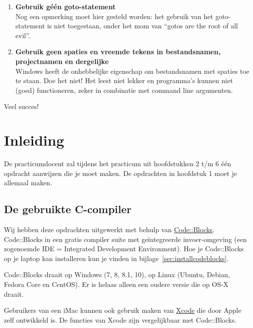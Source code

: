 \documentclass[a4paper,10pt,fleqn,twoside]{article}
\begin{document}
\begin{enumerate}[label=\textbf{\arabic*.}]
Als je niet begrijpt waar het programma fout gaat, steek dan niet direct je hand omhoog. Zet in je code op de plek waar het programma vermoedelijk nog correct werkt een \textsl{breakpoint}\footnote{In de les wordt uitgelegd hoe je dit moet doen.}. Als het programma tijdens het debuggen is gestopt op de plek van de breakpoint, controleer dan goed de inhoud van alle actuele variabelen. Dit is één van de krachtigste manieren om fouten te detecteren en om tot een werkend programma te komen.
\item \textbf{Gebruik géén goto-statement}\\
Nog een opmerking moet hier gesteld worden: het gebruik van het goto-statement is niet toegestaan, onder het mom van ``gotos are the root of all evil''.
\item \textbf{Gebruik geen spaties en vreemde tekens in bestandsnamen, projectnamen en dergelijke}\\
Windows heeft de onhebbelijke eigenschap om bestandsnamen met spaties toe te staan. Doe het niet! Het leest niet lekker en programma’s kunnen niet (goed) functioneren, zeker in combinatie met command line argumenten.
\end{enumerate}


Veel succes!



\section{Inleiding}

De practicumdocent zal tijdens het practicum uit hoofdstukken 2 t/m 6 één opdracht aanwijzen die je moet maken. De opdrachten in hoofdstuk 1 moet je allemaal maken. 

\subsection{De gebruikte C-compiler}
Wij hebben deze opdrachten uitgewerkt met behulp van \href{http://www.codeblocks.org/}{Code::Blocks}. Code::Blocks in een gratis compiler suite met geïntegreerde invoer-omgeving (een zogenoemde IDE = Integrated Development Environment). Hoe je Code::Blocks op je laptop kan installeren kun je vinden in bijlage~\ref{sec:installcodeblocks}.

Code::Blocks draait op Windows (7, 8, 8.1, 10), op Linux (Ubuntu, Debian, Fedora Core en CentOS). Er is helaas alleen een oudere versie die op OS-X draait.

Gebruikers van een iMac kunnen ook gebruik maken van \href{https://developer.apple.com/xcode/}{Xcode} die door Apple zelf ontwikkeld is. De functies van Xcode zijn vergelijkbaar met Code::Blocks.
\end{document}
